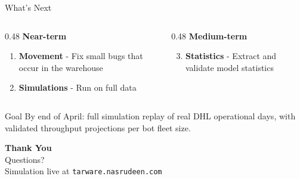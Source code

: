 \documentclass[aspectratio=169, 12pt]{beamer}
\begin{document}
\begin{frame}{What's Next}
  \begin{columns}[T]
    \begin{column}{0.48\textwidth}
      \textbf{Near-term}
      \vspace{0.4em}
      \begin{enumerate}
        \item \textbf{Movement} - Fix small bugs that occur in the warehouse
        \item \textbf{Simulations} - Run on full data
      \end{enumerate}
    \end{column}
    \begin{column}{0.48\textwidth}
      \textbf{Medium-term}
      \vspace{0.4em}
      \begin{enumerate}
        \setcounter{enumi}{2}
        \item \textbf{Statistics} - Extract and validate model statistics
      \end{enumerate}
    \end{column}
  \end{columns}
  \vspace{0.8em}
  \begin{block}{Goal}
    By end of April: full simulation replay of real DHL operational days, with validated throughput projections per bot fleet size.
  \end{block}
\end{frame}

{
\begin{frame}[plain]
  \vspace{2em}
  \begin{center}
    {\Huge\color{dhlYellow}\textbf{Thank You}}\\[1em]
    {\large\color{white} Questions?}\\[2em]
    \color{white!80}\small
    Simulation live at \texttt{tarware.nasrudeen.com}\\[0.3em]
  \end{center}
\end{frame}
}
\end{document}
